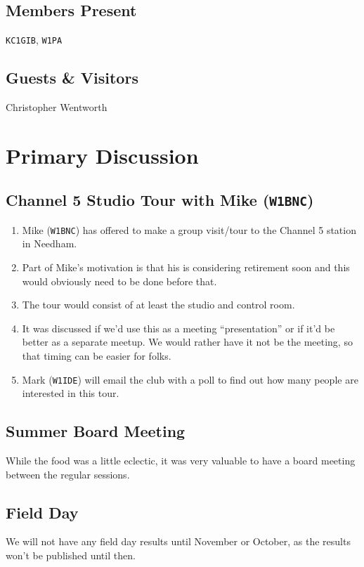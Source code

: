 \documentclass[10pt,letterpaper]{article}
\begin{document}
\subsection{Members Present}
\texttt{KC1GIB}, \texttt{W1PA}

\subsection{Guests \& Visitors}
Christopher Wentworth

\section{Primary Discussion}

\subsection{Channel 5 Studio Tour with Mike (\texttt{W1BNC})}
\begin{enumerate}
  \item Mike (\texttt{W1BNC}) has offered to make a group visit/tour to the Channel 5 station in Needham.
  \item Part of Mike's motivation is that his is considering retirement soon and this would obviously need to be done before that.
  \item The tour would consist of at least the studio and control room.
  \item It was discussed if we'd use this as a meeting ``presentation'' or if it'd be better as a separate meetup. We would rather have it not be the meeting, so that timing can be easier for folks.
  \item Mark (\texttt{W1IDE}) will email the club with a poll to find out how many people are interested in this tour.
\end{enumerate}

\subsection{Summer Board Meeting}
While the food was a little eclectic, it was very valuable to have a board meeting between the regular sessions.

\subsection{Field Day}
We will not have any field day results until November or October, as the results won't be published until then.
\end{document}
